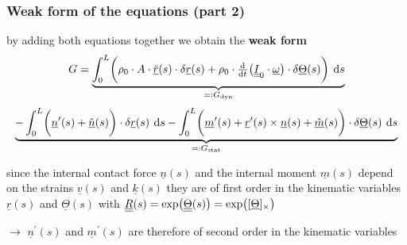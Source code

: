 \begin{frame}
  \frametitle{Weak form of the equations (part 2)}
   
  by adding both equations together we obtain the \textbf{weak form}
  \begin{displaymath}
    G = 
    \underbrace{
    \int_0^L \biggl(
    \rho_0 \cdot A \cdot \underline{\ddot{r}}(s) \cdot \delta \underline{r}(s) +
    \rho_0 \cdot \od{}{t} \bigl( \doubleunderline{I}_0 \cdot \underline{\omega} \bigr) \cdot \delta \underline{\Theta}(s)
    \biggr) \: \dif s
    }_{=: G_{\text{dyn}}}
  \end{displaymath}
  \begin{displaymath}
    \underbrace{
    - \int_0^L \biggl( \underline{n}^{\prime}(s) + \underline{\hat{n}}(s) \biggr) \cdot \delta \underline{r}(s) \: \dif s
    - \int_0^L \biggl( \underline{m}^{\prime}(s) + \underline{r}^{\prime}(s) \times \underline{n}(s) + \underline{\hat{m}}(s) \biggr) \cdot \delta \underline{\Theta}(s) \: \dif s
    }_{=: G_{\text{stat}}}
  \end{displaymath}
  
  \vspace{1em}
  since the internal contact force $\underline{n}(s)$ and the internal moment $\underline{m}(s)$ depend on the strains $\underline{v}(s)$ and $\underline{k}(s)$ they are of first order in the kinematic variables $\underline{r}(s)$ and $\underline{\Theta}(s)$ \newline
  with $\underline{\underline{R}}(s) = \exp \bigl( \underline{\underline{\Theta}}(s) \bigr) = \exp \bigl( [\underline{\Theta}]_{\times} \bigr)$
  
  \vspace{0.5em}
  $\rightarrow$ $\underline{n}^{\prime}(s)$ and $\underline{m}^{\prime}(s)$ are therefore of second order in the kinematic variables

\end{frame}


